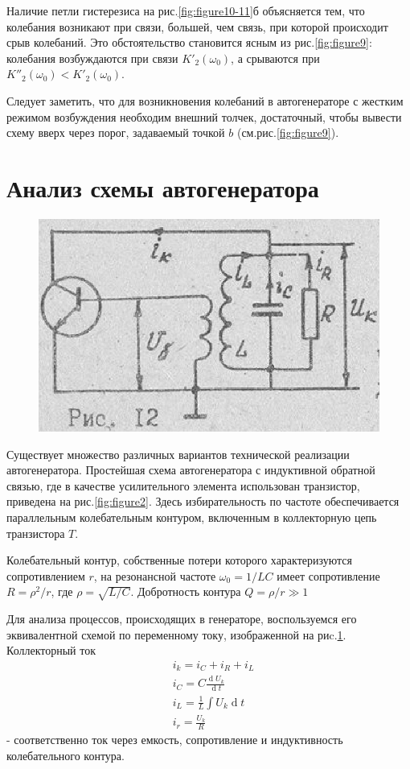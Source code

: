 Наличие петли гистерезиса на рис.\ref{fig:figure10-11}б объясняется тем, что колебания возникают при связи, большей, чем связь, при которой происходит срыв колебаний. Это обстоятельство становится ясным из рис.\ref{fig:figure9}: колебания возбуждаются при связи $K'_2(\omega_0) $, а срываются при $K''_2(\omega_0)<K'_2(\omega_0)$.

Следует заметить, что для возникновения колебаний в автогенераторе с жестким режимом возбуждения необходим внешний толчек, достаточный, чтобы вывести схему вверх через порог, задаваемый точкой $b$ (см.рис.\ref{fig:figure9}).

\section{Анализ схемы автогенератора}
\begin{figure}
\includegraphics[width=\linewidth]{circuit/12.jpg}
\caption{}
\label{fig:figure12}
\vspace{-20pt}
\end{figure}
Существует множество различных вариантов технической реализации автогенератора.
Простейшая схема автогенератора с индуктивной обратной связью, где в качестве усилительного элемента использован транзистор, приведена на рис.\ref{fig:figure2}. Здесь избирательность по частоте обеспечивается параллельным колебательным контуром, включенным в коллекторную цепь транзистора $T$.

Колебательный контур, собственные потери которого характеризуются сопротивлением $r$, на резонансной частоте $\omega_0=1/{LC}$ имеет сопротивление $R=\rho^2/r$, где $\rho=\sqrt{L/C}$. Добротность контура $Q=\rho/r\gg1$

Для анализа процессов, происходящих в генераторе, воспользуемся его эквивалентной схемой по переменному току, изображенной на риc.\ref{fig:figure12}. Коллекторный ток
\begin{equation*}
\begin{aligned}
&i_k=i_C+i_R+i_L \\
&i_C=C\frac{\operatorname dU_k}{\operatorname dt} \\
&i_L=\frac{1}{L}\int U_k \operatorname dt \\
&i_r=\frac{U_k}{R}
\end{aligned}
\end{equation*}
- соответственно ток через емкость, сопротивление и индуктивность колебательного контура.

